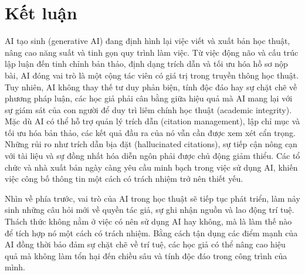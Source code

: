 \section{Kết luận}

AI tạo sinh (generative AI) đang định hình lại việc viết và xuất bản học thuật, nâng cao năng suất và tinh gọn quy trình làm việc. Từ việc động não và cấu trúc lập luận đến tinh chỉnh bản thảo, định dạng trích dẫn và tối ưu hóa hồ sơ nộp bài, AI đóng vai trò là một cộng tác viên có giá trị trong truyền thông học thuật. Tuy nhiên, AI không thay thế tư duy phản biện, tính độc đáo hay sự chặt chẽ về phương pháp luận, các học giả phải cân bằng giữa hiệu quả mà AI mang lại với sự giám sát của con người để duy trì liêm chính học thuật (academic integrity). Mặc dù AI có thể hỗ trợ quản lý trích dẫn (citation management), lập chỉ mục và tối ưu hóa bản thảo, các kết quả đầu ra của nó vẫn cần được xem xét cẩn trọng. Những rủi ro như trích dẫn bịa đặt (hallucinated citations), sự tiếp cận nông cạn với tài liệu và sự đồng nhất hóa diễn ngôn phải được chủ động giảm thiểu. Các tổ chức và nhà xuất bản ngày càng yêu cầu minh bạch trong việc sử dụng AI, khiến việc công bố thông tin một cách có trách nhiệm trở nên thiết yếu.

Nhìn về phía trước, vai trò của AI trong học thuật sẽ tiếp tục phát triển, làm nảy sinh những câu hỏi mới về quyền tác giả, sự ghi nhận nguồn và lao động trí tuệ. Thách thức không nằm ở việc có nên sử dụng AI hay không, mà là làm thế nào để tích hợp nó một cách có trách nhiệm. Bằng cách tận dụng các điểm mạnh của AI đồng thời bảo đảm sự chặt chẽ về trí tuệ, các học giả có thể nâng cao hiệu quả mà không làm tổn hại đến chiều sâu và tính độc đáo trong công trình của mình.
